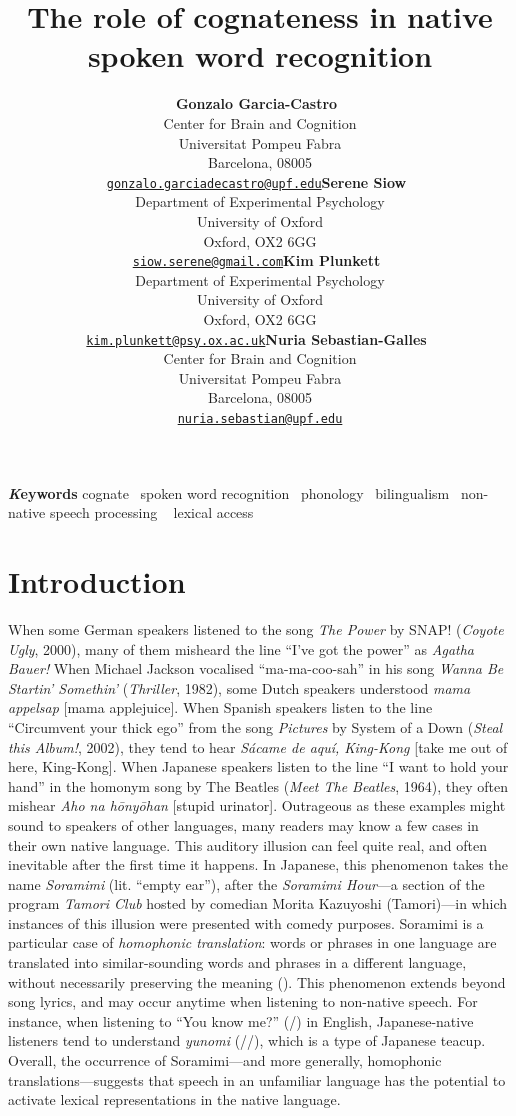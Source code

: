 \documentclass[
]{article}
\title{The role of cognateness in native spoken word recognition}
\author{\textbf{Gonzalo
Garcia-Castro}~\orcidlink{0000-0002-8553-4209}\\Center for Brain and
Cognition\\Universitat Pompeu Fabra\\Barcelona,
08005\\\texttt{\href{mailto:gonzalo.garciadecastro@upf.edu}{gonzalo.garciadecastro@upf.edu}}\And\textbf{Serene
Siow}~\orcidlink{0000-0001-6482-2191}\\Department of Experimental
Psychology\\University of Oxford\\Oxford, OX2
6GG\\\texttt{\href{mailto:siow.serene@gmail.com}{siow.serene@gmail.com}}\And\textbf{Kim
Plunkett}~\orcidlink{0000-0003-0216-7480}\\Department of Experimental
Psychology\\University of Oxford\\Oxford, OX2
6GG\\\texttt{\href{mailto:kim.plunkett@psy.ox.ac.uk}{kim.plunkett@psy.ox.ac.uk}}\And\textbf{Nuria
Sebastian-Galles}~\orcidlink{0000-0001-6938-2498}\\Center for Brain and
Cognition\\Universitat Pompeu Fabra\\Barcelona,
08005\\\texttt{\href{mailto:nuria.sebastian@upf.edu}{nuria.sebastian@upf.edu}}}
\date{}
\begin{document}
\maketitle
{\bfseries \emph Keywords}
\def\sep{\textbullet\ }
cognate \sep spoken word
recognition \sep phonology \sep bilingualism \sep non-native speech
processing \sep 
lexical access



\section{Introduction}\label{introduction}

When some German speakers listened to the song \emph{The Power} by SNAP!
(\emph{Coyote Ugly}, 2000), many of them misheard the line ``I've got
the power'' as \emph{Agatha Bauer!} When Michael Jackson vocalised
``ma-ma-coo-sah'' in his song \emph{Wanna Be Startin' Somethin'}
(\emph{Thriller}, 1982), some Dutch speakers understood \emph{mama
appelsap} {[}mama applejuice{]}. When Spanish speakers listen to the
line ``Circumvent your thick ego'' from the song \emph{Pictures} by
System of a Down (\emph{Steal this Album!}, 2002), they tend to hear
\emph{Sácame de aquí, King-Kong} {[}take me out of here, King-Kong{]}.
When Japanese speakers listen to the line ``I want to hold your hand''
in the homonym song by The Beatles (\emph{Meet The Beatles}, 1964), they
often mishear \emph{Aho na hōnyōhan} {[}stupid urinator{]}. Outrageous
as these examples might sound to speakers of other languages, many
readers may know a few cases in their own native language. This auditory
illusion can feel quite real, and often inevitable after the first time
it happens. In Japanese, this phenomenon takes the name \emph{Soramimi}
(lit. ``empty ear''), after the \emph{Soramimi Hour}---a section of the
program \emph{Tamori Club} hosted by comedian Morita Kazuyoshi
(Tamori)---in which instances of this illusion were presented with
comedy purposes. Soramimi is a particular case of \emph{homophonic
translation}: words or phrases in one language are translated into
similar-sounding words and phrases in a different language, without
necessarily preserving the meaning
(). This phenomenon
extends beyond song lyrics, and may occur anytime when listening to
non-native speech. For instance, when listening to ``You know me?''
(/) in English, Japanese-native listeners tend to
understand \emph{yunomi} (//), which is a type of
Japanese teacup. Overall, the occurrence of Soramimi---and more
generally, homophonic translations---suggests that speech in an
unfamiliar language has the potential to activate lexical
representations in the native language.
\end{document}
